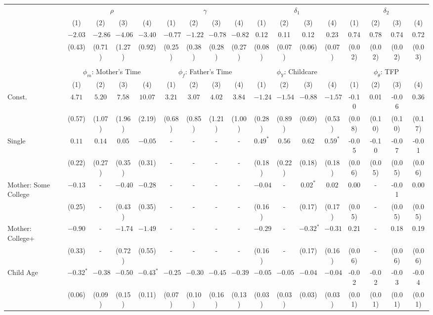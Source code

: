 \begin{tabular}{lcccccccccccccccc}\\\toprule
 & \multicolumn{4}{c}{$\rho$} & \multicolumn{4}{c}{$\gamma$} & \multicolumn{4}{c}{$\delta_{1}$} & \multicolumn{4}{c}{$\delta_{2}$} \\
&(1)&(2)&(3)&(4)&(1)&(2)&(3)&(4)&(1)&(2)&(3)&(4)&(1)&(2)&(3)&(4)\\\cmidrule(r){2-5}\cmidrule(r){6-9}\cmidrule(r){10-13}\cmidrule(r){14-17}
&$-2.03$&$-2.86$&$-4.06$&$-3.40$&$-0.77$&$-1.22$&$-0.78$&$-0.82$&0.12&0.11&0.12&0.23&0.74&0.78&0.74&0.72\\
&(0.43)&(0.71)&(1.27)&(0.92)&(0.25)&(0.38)&(0.28)&(0.27)&(0.08)&(0.07)&(0.06)&(0.07)&(0.02)&(0.02)&(0.02)&(0.03)\\
&&&&&&&&&&&&&&&&\\
 & \multicolumn{4}{c}{$\phi_{m}$: Mother's Time} & \multicolumn{4}{c}{$\phi_{f}$: Father's Time} & \multicolumn{4}{c}{$\phi_{Y}$: Childcare} & \multicolumn{4}{c}{$\phi_{\theta}$: TFP} \\
&(1)&(2)&(3)&(4)&(1)&(2)&(3)&(4)&(1)&(2)&(3)&(4)&(1)&(2)&(3)&(4)\\\cmidrule(r){2-5}\cmidrule(r){6-9}\cmidrule(r){10-13}\cmidrule(r){14-17}
Const.&$4.71$&$5.20$&$7.58$&$10.07$&$3.21$&$3.07$&$4.02$&$3.84$&$-1.24$&$-1.54$&$-0.88$&$-1.57$&-0.10&0.01&-0.06&0.36\\
&(0.57)&(1.07)&(1.96)&(2.19)&(0.68)&(0.85)&(1.21)&(1.00)&(0.28)&(0.89)&(0.69)&(0.53)&(0.08)&(0.10)&(0.10)&(0.17)\\
Single&$0.11$&$0.14$&$0.05$&$-0.05$&-&-&-&-&$0.49^{*}$&$0.56$&$0.62$&$0.59^{*}$&-0.05&-0.10&-0.07&-0.01\\
&(0.22)&(0.27)&(0.35)&(0.31)&-&-&-&-&(0.18)&(0.22)&(0.18)&(0.18)&(0.06)&(0.05)&(0.05)&(0.06)\\
Mother: Some College&$-0.13$&-&$-0.40$&$-0.28$&-&-&-&-&$-0.04$&-&$0.02^{*}$&$0.02$&0.00&-&-0.01&0.00\\
&(0.25)&-&(0.43)&(0.35)&-&-&-&-&(0.16)&-&(0.17)&(0.17)&(0.05)&-&(0.05)&(0.05)\\
Mother: College+&$-0.90$&-&$-1.74$&$-1.49$&-&-&-&-&$-0.29$&-&$-0.32^{*}$&$-0.31$&0.21&-&0.18&0.19\\
&(0.33)&-&(0.72)&(0.55)&-&-&-&-&(0.16)&-&(0.17)&(0.16)&(0.06)&-&(0.06)&(0.06)\\
Child Age&$-0.32^{*}$&$-0.38$&$-0.50$&$-0.43^{*}$&$-0.25$&$-0.30$&$-0.45$&$-0.39$&$-0.05$&$-0.05$&$-0.04$&$-0.04$&-0.02&-0.02&-0.03&-0.04\\
&(0.06)&(0.09)&(0.15)&(0.11)&(0.07)&(0.10)&(0.16)&(0.13)&(0.03)&(0.03)&(0.03)&(0.03)&(0.01)&(0.01)&(0.01)&(0.01)\\

\end{tabular}

